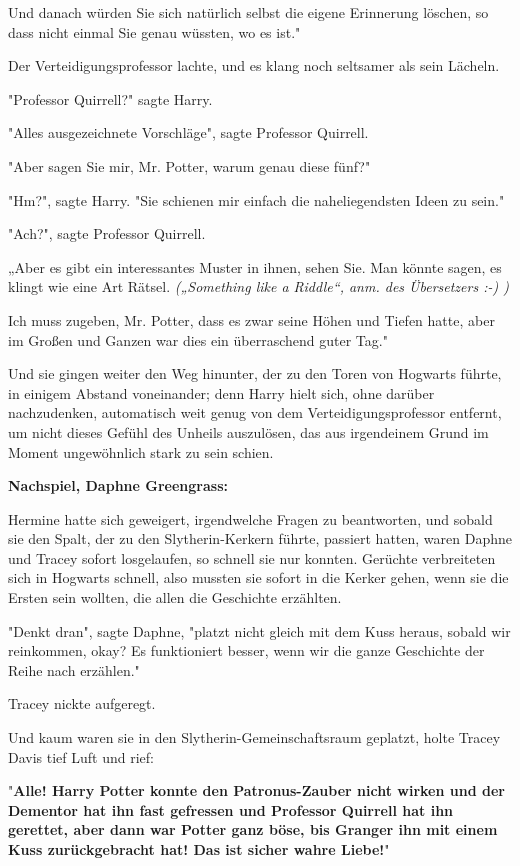 {Und danach würden Sie sich natürlich selbst die eigene Erinnerung löschen, so dass nicht einmal Sie genau wüssten, wo es ist."

Der Verteidigungsprofessor lachte, und es klang noch seltsamer als sein Lächeln.

"Professor Quirrell?" sagte Harry.

"Alles ausgezeichnete Vorschläge", sagte Professor Quirrell.

"Aber sagen Sie mir, Mr. Potter, warum genau diese fünf?"

"Hm?", sagte Harry. "Sie schienen mir einfach die naheliegendsten Ideen zu sein."

"Ach?", sagte Professor Quirrell.

„Aber es gibt ein interessantes Muster in ihnen, sehen Sie. Man könnte sagen, es klingt wie eine Art Rätsel. \emph{(„Something like a Riddle“, anm. des Übersetzers :-) )}

Ich muss zugeben, Mr. Potter, dass es zwar seine Höhen und Tiefen hatte, aber im Großen und Ganzen war dies ein überraschend guter Tag."

Und sie gingen weiter den Weg hinunter, der zu den Toren von Hogwarts führte, in einigem Abstand voneinander; denn Harry hielt sich, ohne darüber nachzudenken, automatisch weit genug von dem Verteidigungsprofessor entfernt, um nicht dieses Gefühl des Unheils auszulösen, das aus irgendeinem Grund im Moment ungewöhnlich stark zu sein schien.

\textbf{Nachspiel, Daphne Greengrass:}

Hermine hatte sich geweigert, irgendwelche Fragen zu beantworten, und sobald sie den Spalt, der zu den Slytherin-Kerkern führte, passiert hatten, waren Daphne und Tracey sofort losgelaufen, so schnell sie nur konnten. Gerüchte verbreiteten sich in Hogwarts schnell, also mussten sie sofort in die Kerker gehen, wenn sie die Ersten sein wollten, die allen die Geschichte erzählten.

"Denkt dran", sagte Daphne, "platzt nicht gleich mit dem Kuss heraus, sobald wir reinkommen, okay? Es funktioniert besser, wenn wir die ganze Geschichte der Reihe nach erzählen."

Tracey nickte aufgeregt.

Und kaum waren sie in den Slytherin-Gemeinschaftsraum geplatzt, holte Tracey Davis tief Luft und rief:

"\textbf{Alle! Harry Potter konnte den Patronus-Zauber nicht wirken und der Dementor hat ihn fast gefressen und Professor Quirrell hat ihn gerettet, aber dann war Potter ganz böse, bis Granger ihn mit einem Kuss zurückgebracht hat! Das ist sicher wahre Liebe!}"

}
